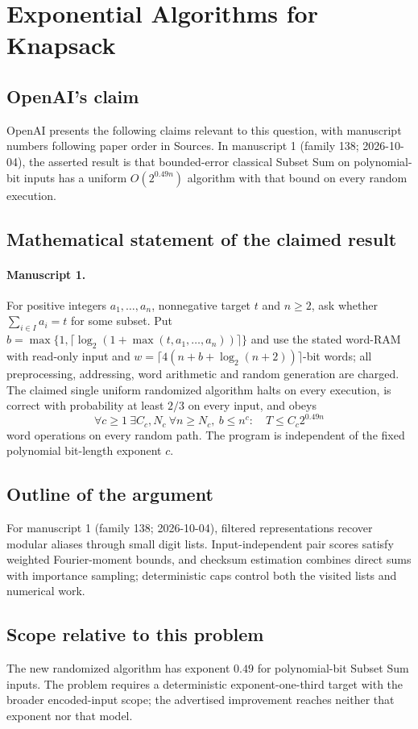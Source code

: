 \documentclass[11pt]{article}
\begin{document}
\section*{Exponential Algorithms for Knapsack}

\subsection{OpenAI's claim}
OpenAI presents the following claims relevant to this question, with manuscript numbers following paper order in Sources. In manuscript 1 (family 138; 2026-10-04), the asserted result is that bounded-error classical Subset Sum on polynomial-bit inputs has a uniform $O(2^{0.49n})$ algorithm with that bound on every random execution.

\subsection{Mathematical statement of the claimed result}
\paragraph{Manuscript 1.}
For positive integers $a_1,\ldots,a_n$, nonnegative target $t$ and $n\ge2$, ask whether $\sum_{i\in I}a_i=t$ for some subset. Put $b=\max\{1,\lceil\log_2(1+\max(t,a_1,\ldots,a_n))\rceil\}$ and use the stated word-RAM with read-only input and $w=\lceil4(n+b+\log_2(n+2))\rceil$-bit words; all preprocessing, addressing, word arithmetic and random generation are charged. The claimed single uniform randomized algorithm halts on every execution, is correct with probability at least $2/3$ on every input, and obeys
\[
 \forall c\ge1\ \exists C_c,N_c\ \forall n\ge N_c,\ b\le n^c:
 \quad T\le C_c2^{0.49n}
\]
word operations on every random path. The program is independent of the fixed polynomial bit-length exponent $c$.

\subsection{Outline of the argument}
For manuscript 1 (family 138; 2026-10-04), filtered representations recover modular aliases through small digit lists. Input-independent pair scores satisfy weighted Fourier-moment bounds, and checksum estimation combines direct sums with importance sampling; deterministic caps control both the visited lists and numerical work.

\subsection{Scope relative to this problem}
The new randomized algorithm has exponent $0.49$ for polynomial-bit Subset Sum inputs. The problem requires a deterministic exponent-one-third target with the broader encoded-input scope; the advertised improvement reaches neither that exponent nor that model.
\end{document}
